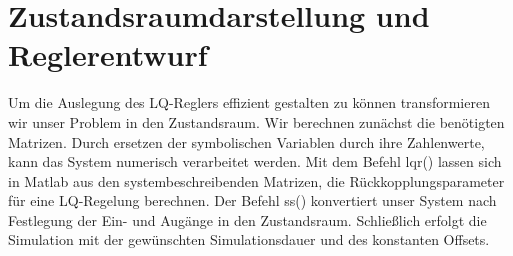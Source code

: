 \documentclass[a4paper, 10pt]{report}
\begin{document}
\section{Zustandsraumdarstellung und Reglerentwurf}
Um die Auslegung des LQ-Reglers effizient gestalten zu können transformieren wir unser Problem in den Zustandsraum. Wir berechnen zunächst die benötigten Matrizen. Durch ersetzen der symbolischen Variablen durch ihre Zahlenwerte, kann das System numerisch verarbeitet werden. Mit dem Befehl lqr() lassen sich in Matlab aus den systembeschreibenden Matrizen, die Rückkopplungsparameter für eine LQ-Regelung berechnen. Der Befehl ss() konvertiert unser System nach Festlegung der Ein- und Augänge in den Zustandsraum. Schließlich erfolgt die Simulation mit der gewünschten Simulationsdauer und des konstanten Offsets.
\end{document}
